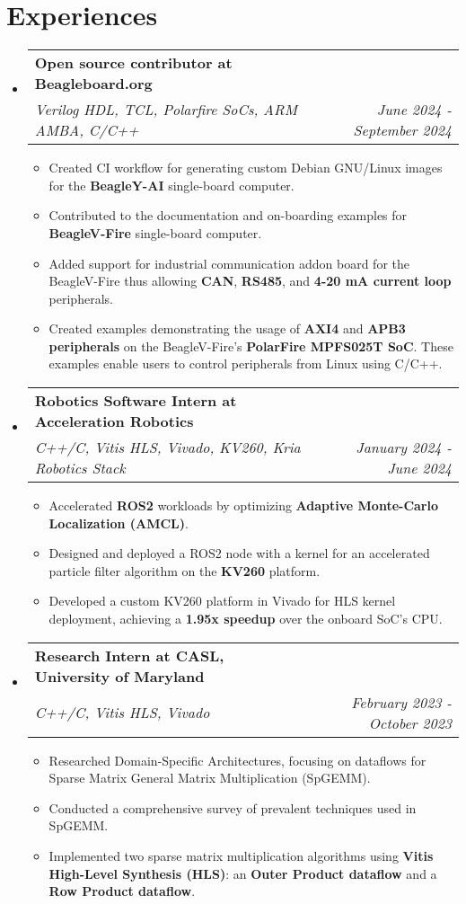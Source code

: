 \documentclass[letterpaper,11pt]{article}
\makeatletter
\newcommand{\resumeItem}[1]{
  \item\small{
    {#1 \vspace{-2pt}}
  }
}
\newcommand{\resumeSubheading}[4]{
  \vspace{-2pt}\item
    \begin{tabular*}{1.0\textwidth}[t]{l@{\extracolsep{\fill}}r}
      \textbf{#1} & \textbf{\small #2} \\
      \textit{\small#3} & \textit{\small #4} \\
    \end{tabular*}\vspace{-7pt}
}
\newcommand{\resumeSubHeadingListStart}{\begin{itemize}[leftmargin=0.0in, label={}]}
\newcommand{\resumeSubHeadingListEnd}{\end{itemize}}
\newcommand{\resumeItemListStart}{\begin{itemize}}
\newcommand{\resumeItemListEnd}{\end{itemize}\vspace{-5pt}}
\makeatother
\begin{document}
\section{Experiences}
\resumeSubHeadingListStart
\resumeSubheading
{Open source contributor at Beagleboard.org \href{https://openbeagle.org/superchamp234}{\faExternalLink}}{}{Verilog HDL, TCL, Polarfire SoCs, ARM AMBA, C/C++}{June 2024 - September 2024}
\resumeItemListStart
\resumeItem{Created CI workflow for generating custom Debian GNU/Linux images for the \textbf{BeagleY-AI} single-board computer.}
\resumeItem{Contributed to the documentation and on-boarding examples for \textbf{BeagleV-Fire} single-board computer.}
\resumeItem{Added support for industrial communication addon board for the BeagleV-Fire thus allowing \textbf{CAN}, \textbf{RS485}, and \textbf{4-20 mA current loop} peripherals.}
\resumeItem{Created examples demonstrating the usage of \textbf{AXI4} and \textbf{APB3 peripherals} on the BeagleV-Fire's \textbf{PolarFire MPFS025T SoC}. These examples enable users to control peripherals from Linux using C/C++.}
\resumeItemListEnd
\resumeSubheading
{Robotics Software Intern at Acceleration Robotics \href{https://drive.google.com/file/d/1zK9jAKZ9oBVwV1-_GcFWSXyqZOX0cpnZ/view?usp=sharing}{\faExternalLink}}{}{C++/C, Vitis HLS, Vivado, KV260, Kria Robotics Stack}{January 2024 - June 2024}
\resumeItemListStart
\resumeItem{Accelerated \textbf{ROS2} workloads by optimizing \textbf{Adaptive Monte-Carlo Localization (AMCL)}.}
\resumeItem{Designed and deployed a ROS2 node with a kernel for an accelerated particle filter algorithm on the \textbf{KV260} platform.}
\resumeItem{Developed a custom KV260 platform in Vivado for HLS kernel deployment, achieving a \textbf{1.95x speedup} over the onboard SoC's CPU.}
\resumeItemListEnd
\resumeSubheading
{Research Intern at CASL, University of Maryland  \href{{https://drive.google.com/drive/folders/19r-r_VaqXl1FvfySPe8bHm7v4QKsKUU0?usp=sharing}}{\faExternalLink}}{}
{C++/C, Vitis HLS, Vivado}{February 2023 - October 2023}
\resumeItemListStart
\resumeItem{Researched Domain-Specific Architectures, focusing on dataflows for Sparse Matrix General Matrix Multiplication (SpGEMM).}
\resumeItem{Conducted a comprehensive survey of prevalent techniques used in SpGEMM.}
\resumeItem{Implemented two sparse matrix multiplication algorithms using \textbf{Vitis High-Level Synthesis (HLS)}: an \textbf{Outer Product dataflow} and a \textbf{Row Product dataflow}.}
\resumeItemListEnd
\resumeSubHeadingListEnd
\end{document}
